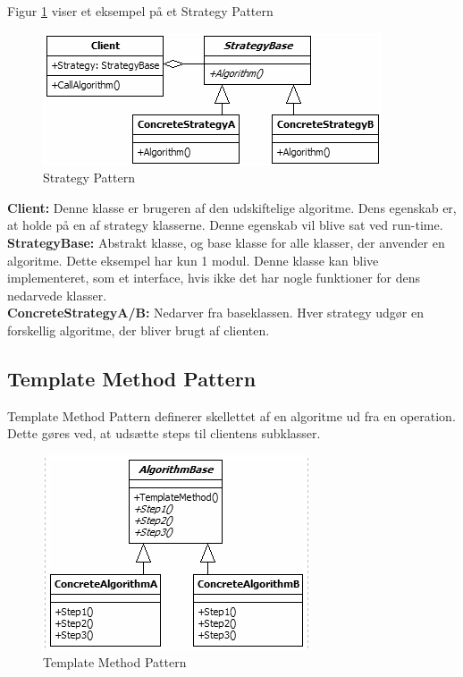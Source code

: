 \documentclass[../report.tex]{subfiles}
\begin{document}
Figur \ref{fig:strategy_pattern} viser et eksempel på et Strategy Pattern

\begin{figure}[H]
    \centering
    \includegraphics{pics/strategy_pattern.PNG}
    \caption{Strategy Pattern}
    \label{fig:strategy_pattern}
\end{figure}

\textbf{Client:} Denne klasse er brugeren af den udskiftelige algoritme. Dens egenskab er, at holde på en af strategy klasserne. Denne egenskab vil blive sat ved run-time.
\\

\textbf{StrategyBase:} Abstrakt klasse, og base klasse for alle klasser, der anvender en algoritme. Dette eksempel har kun 1 modul. Denne klasse kan blive implementeret, som et interface, hvis ikke det har nogle funktioner for dens nedarvede klasser.
\\

\textbf{ConcreteStrategyA/B:} Nedarver fra baseklassen. Hver strategy udgør en forskellig algoritme, der bliver brugt af clienten.

\subsection*{Template Method Pattern}
Template Method Pattern definerer skellettet af en algoritme ud fra en operation. Dette gøres ved, at udsætte steps til clientens subklasser.

\begin{figure}[H]
    \centering
    \includegraphics{pics/template_method_pattern.PNG}
    \caption{Template Method Pattern}
    \label{fig:template_method_pattern}
\end{figure}
\end{document}
